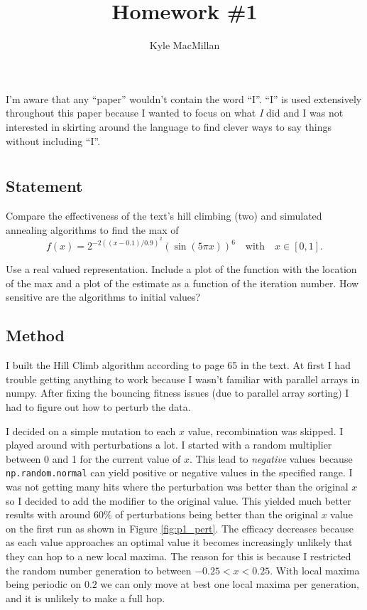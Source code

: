 \documentclass[12pt]{article}
\title{Homework \#1}
\author{Kyle MacMillan}
\begin{document}
\maketitle

I'm aware that any ``paper'' wouldn't contain the word ``I''. ``I'' is used 
extensively throughout this paper because I wanted to focus on what \textit{I} 
did and I was not interested in skirting around the language to find clever ways 
to say things without including ``I''. 

\section{} %

\subsection{Statement}
Compare the effectiveness of the text's hill climbing (two) and simulated annealing algorithms to find the max of
$$
f(x)=2^{-2((x-0.1)/0.9)^2}(\sin(5\pi x))^6 \quad
   \mbox{with} \quad x\in [0,1].
$$

Use a real valued representation.  Include a plot of the function with the 
location of the max and a plot of the estimate as a function of the iteration 
number. How sensitive are the algorithms to initial values?

\subsection{Method}

$$$$
I built the Hill Climb algorithm according to page 65 in the text. At first I 
had trouble getting anything to work because I wasn't familiar with parallel 
arrays in numpy. After fixing the bouncing fitness issues (due to parallel array 
sorting) I had to figure out how to perturb the data. 

$$$$
I decided on a simple mutation to each $x$ value, recombination was skipped. I 
played around with perturbations a lot. I started with a random multiplier 
between 0 and 1 for the current value of $x$. This lead to \textit{negative} 
values because \texttt{np.random.normal} can yield positive or negative values 
in the specified range. I was not getting many hits where the perturbation was 
better than the original $x$ so I decided to add the modifier to the original 
value. This yielded much better results with around $60\%$ of perturbations 
being better than the original $x$ value on the first run as shown in Figure 
\ref{fig:p1_pert}. The efficacy decreases because as each value approaches an 
optimal value it becomes increasingly unlikely that they can hop to a new local 
maxima. The reason for this is because I restricted the random number generation 
to between $-0.25 < x < 0.25$. With local maxima being periodic on $0.2$ we can 
only move at best one local maxima per generation, and it is unlikely to make a 
full hop.
\end{document}
